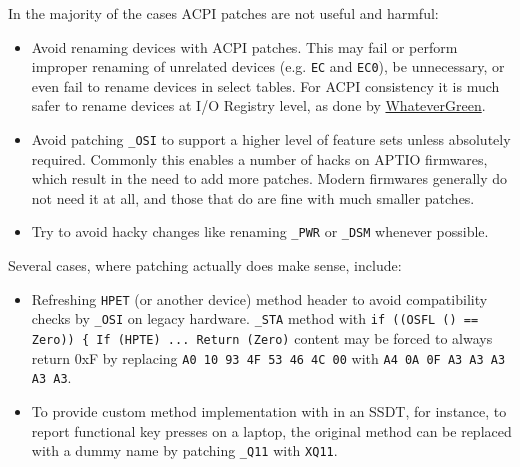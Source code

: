 \documentclass[]{article}
\providecommand{\DIFaddtex}[1]{{\protect\color{blue}\uwave{#1}}} %
\providecommand{\DIFdeltex}[1]{{\protect\color{red}\sout{#1}}}                      %
\providecommand{\DIFaddbegin}{\global\booltrue{DIFkeeppage}\global\booltrue{DIFchange}} %
\providecommand{\DIFaddend}{\global\booltrue{DIFkeeppage}\global\boolfalse{DIFchange}} %
\providecommand{\DIFdelbegin}{\global\booltrue{DIFkeeppage}\global\booltrue{DIFchange}} %
\providecommand{\DIFdelend}{\global\booltrue{DIFkeeppage}\global\boolfalse{DIFchange}} %
\providecommand{\DIFadd}[1]{\texorpdfstring{\DIFaddtex{#1}}{#1}} %
\providecommand{\DIFdel}[1]{\texorpdfstring{\DIFdeltex{#1}}{}} %
\begin{document}

In the majority of the cases ACPI patches are not useful and harmful:

\begin{itemize}
\item
  Avoid renaming devices with ACPI patches. This may fail or perform
  improper renaming of unrelated devices (e.g. \texttt{EC} and
  \texttt{EC0}), be unnecessary, or even fail to rename devices in select tables. For
  ACPI consistency it is much safer to rename devices at I/O Registry
  level, as done by
  \href{https://github.com/acidanthera/WhateverGreen}{WhateverGreen}.
\item
  Avoid patching \texttt{\_OSI} to support a higher level of feature sets
  unless absolutely required. Commonly this enables a number of hacks on APTIO
  firmwares, which result in the need to add more patches. Modern firmwares
  generally do not need it at all, and those that do are fine with much
  smaller patches.
\item
  Try to avoid hacky changes like renaming \texttt{\_PWR} or \texttt{\_DSM}
  whenever possible.
\end{itemize}

Several cases, where patching actually does make sense, include:

\begin{itemize}
\item
  Refreshing \texttt{HPET} (or another device) method header to avoid
  compatibility checks by \texttt{\_OSI} on legacy hardware. \texttt{\_STA}
  method with \texttt{if ((OSFL () == Zero)) \{ If (HPTE)  ...  Return (Zero)}
  content may be forced to always return 0xF by replacing
  \texttt{A0 10 93 4F 53 46 4C 00} with \texttt{A4 0A 0F A3 A3 A3 A3 A3}.
\item
  To provide custom method implementation with in an SSDT, for instance,
  to report functional key presses on a laptop, the original method can be replaced
  with a dummy name by patching \texttt{\_Q11} with \texttt{XQ11}.
\end{itemize}
\end{document}

